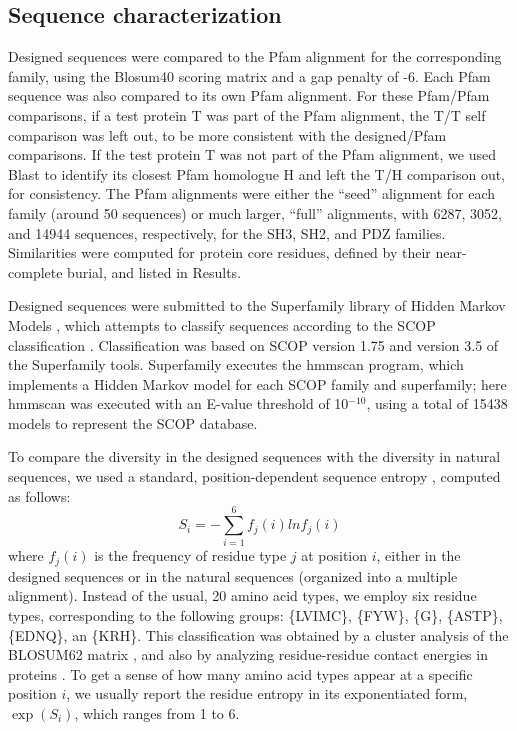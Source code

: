 \documentclass[a4paper,12pt]{article}
\begin{document}
\subsection{Sequence characterization}
Designed sequences were compared to the Pfam alignment for the corresponding family, using the Blosum40 scoring
matrix and a gap penalty of -6. Each Pfam sequence was also compared to its own Pfam alignment. For these Pfam/Pfam
comparisons, if a test protein T was part of the Pfam alignment, the T/T self comparison was left out, to be more
consistent with the designed/Pfam comparisons. If the test protein T was not part of the Pfam alignment, we used
Blast to identify its closest Pfam homologue H and left the T/H comparison out, for consistency. The Pfam alignments
were either the ``seed'' alignment for each family (around 50 sequences) or much larger, ``full'' alignments, with
6287, 3052, and 14944 sequences, respectively, for the SH3, SH2, and PDZ families. Similarities were computed for
protein core residues, defined by their near-complete burial, and listed in Results.

Designed sequences were submitted to the Superfamily library of Hidden Markov Models \cite{Gough01,Wilson07},
which attempts to classify sequences according to the SCOP classification \cite{Andreeva04}. Classification
was based on SCOP version 1.75 and version 3.5 of the Superfamily tools. Superfamily executes the hmmscan
program, which implements a Hidden Markov model for each SCOP family and superfamily; here hmmscan was executed
with an E-value threshold of 10$^{-10}$, using a total of 15438 models to represent the SCOP database.

To compare the diversity in the designed sequences with the diversity in natural sequences, we used a standard,
position-dependent sequence entropy \cite{DurbinBK}, computed as follows:
\begin{equation} \label{eq:entropy}
S_i = - \sum_{i=1}^6 f_j (i) ln f_j (i)
\end{equation}
where $f_j(i)$ is the frequency of residue type $j$ at position $i$, either in the designed sequences or in the
natural sequences (organized into a multiple alignment). Instead of the usual, 20 amino acid types, we employ
six residue types, corresponding to the following groups: \{LVIMC\}, \{FYW\}, \{G\}, \{ASTP\}, \{EDNQ\}, an
\{KRH\}. This classification was obtained by a cluster analysis of the BLOSUM62 matrix \cite{Murphy02}, and also
by analyzing residue-residue contact energies in proteins \cite{Launay07}. To get a sense of how many amino acid
types appear at a specific position $i$, we usually report the residue entropy in its exponentiated form, $\exp(S_i)$,
which ranges from 1 to 6. 
\end{document}
